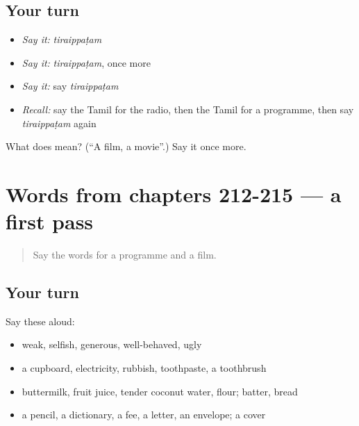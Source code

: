 \subsection*{Your turn}
\begin{itemize}
\raggedright
  \item \emph{Say it:} \emph{tiraippaṭam}
  \item \emph{Say it:} \emph{tiraippaṭam}, once more
  \item \emph{Say it:} say \emph{tiraippaṭam}
  \item \emph{Recall:} say the Tamil for the radio, then the Tamil for a programme, then say \emph{tiraippaṭam} again
\end{itemize}

\begin{tcolorbox}[breakable,colback=teal!4,colframe=teal!35!black,title={Before you move on}]
What does  mean? (\textquotedblleft{}A film, a movie\textquotedblright{}.) Say it once more.
\end{tcolorbox}
\section[(dialogue)]{Words from chapters 212-215 — a first pass}

\label{lesson:TA-R220-first-pass-words-from-chapters-212-215}



\begin{quote}
Say the words for a programme and a film.
\end{quote}

\subsection*{Your turn}
Say these aloud:

\begin{itemize}
\raggedright
  \item weak, selfish, generous, well-behaved, ugly
  \item a cupboard, electricity, rubbish, toothpaste, a toothbrush
  \item buttermilk, fruit juice, tender coconut water, flour; batter, bread
  \item a pencil, a dictionary, a fee, a letter, an envelope; a cover
\end{itemize}

